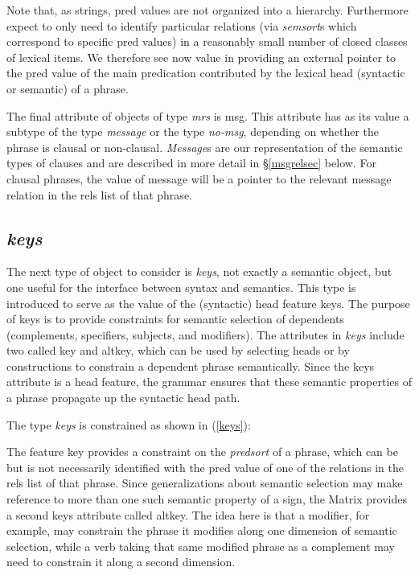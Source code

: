 \documentclass[12pt]{article}
\newcommand{\es}{\enumsentence}
\begin{document}
Note that, as strings, {\sc pred} values are not organized into a hierarchy.
Furthermore expect to only need to identify particular relations
(via {\it semsort}s which correspond to specific {\sc pred} values)
in a reasonably small number of closed classes of lexical items.
We therefore see now value in providing an external pointer to the
{\sc pred} value of the main predication contributed by the lexical
head (syntactic or semantic) of a phrase.


The final attribute of objects of type {\it mrs} is {\sc msg}.
This attribute has as its value a subtype of the type {\it message} 
or the type {\it no-msg}, depending on whether the phrase is clausal
or non-clausal.  {\it Message}s are our representation of the 
semantic types of clauses and are described in more detail in
\S\ref{msgrelsec} below.  For clausal phrases, the value of {\sc message}
will be a pointer to the relevant message relation in the {\sc rels} list
of that phrase.  


\subsection{{\it keys}}
\label{keysec}

The next type of object to consider is {\it keys}, not exactly a semantic
object, but one useful for the interface between syntax and semantics.  
This type is
introduced to serve as the value of the (syntactic) {\sc head} feature 
{\sc keys}. 
The purpose of {\sc keys} is to provide constraints for semantic
selection of dependents (complements, specifiers, subjects, and
modifiers).  The attributes in {\it keys} include two called {\sc key}
and {\sc altkey}, which can be used by selecting heads or by constructions
to constrain a dependent phrase semantically.
Since the {\sc keys} attribute is a {\sc head} feature,
the grammar ensures that these semantic properties of a phrase
propagate up the syntactic head path.

The type {\it keys} is constrained as shown in (\ref{keys}):

\es{\label{keys}
\begin{avm}
\[ key & predsort \\
   altkey & predsort \]
\end{avm}
}

The feature {\sc key} provides a constraint on the {\it predsort} of a phrase,
which can be but is not necessarily identified with the {\sc pred} value of one
of the relations in the {\sc rels} list of that phrase.  Since generalizations
about semantic selection may make reference to more than one such semantic
property of a sign, the Matrix provides a second {\sc keys} attribute called
{\sc altkey}.  The idea here is that a modifier, for example, may constrain the
phrase it modifies along one dimension of semantic selection, while a verb
taking that same modified phrase as a complement may need to constrain it along
a second dimension.
\end{document}
